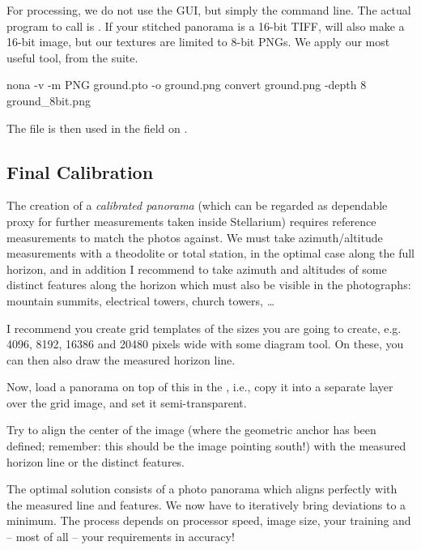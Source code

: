 For processing, we do not use the  GUI, but simply the
command line. The actual program to call is .  If your
stitched panorama is a 16-bit TIFF,  will also make a
16-bit image, but our textures are limited to 8-bit PNGs. We apply our
most useful tool,  from the 
suite.

\begin{commands}
nona -v -m PNG  ground.pto -o ground.png
convert ground.png -depth 8 ground_8bit.png
\end{commands}

The file  is then used in the 
field on .


\subsection{Final Calibration}
\label{sec:landscapes:FinalCalibration}

The creation of a \emph{calibrated panorama} (which can be regarded as
dependable proxy for further measurements taken inside Stellarium)
requires reference measurements to match the photos against. We must
take azimuth/altitude measurements with a theodolite or total station,
in the optimal case along the full horizon, and in addition I
recommend to take azimuth and altitudes of some distinct features along
the horizon which must also be visible in the photographs: mountain
summits, electrical towers, church towers, \ldots

I recommend you create grid templates of the sizes you are going to
create, e.g. 4096, 8192, 16386 and 20480 pixels wide with some diagram
tool. On these, you can then also draw the measured horizon line.

Now, load a panorama on top of this in the , i.e., copy it
into a separate layer over the grid image, and set it
semi-transparent.

Try to align the center of the image (where the
geometric anchor has been defined; remember: this should be the
image pointing south!) with the measured horizon line or the distinct features.

The optimal solution consists of a photo panorama which aligns
perfectly with the measured line and features. We now have to
iteratively bring deviations to a minimum. The process depends on
processor speed, image size, your training  and -- most
of all -- your requirements in accuracy!


